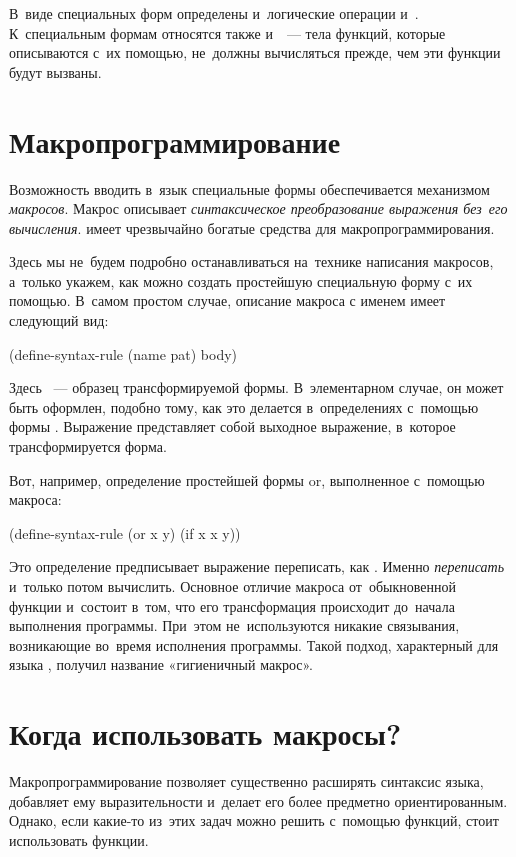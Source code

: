 В~виде специальных форм определены и~логические операции  и~. К~специальным формам относятся также  и~~--- тела функций, которые описываются с~их помощью, не~должны вычисляться прежде, чем эти функции будут вызваны.


\section{Макропрограм\-мирование}\label{macro}%
Возможность вводить в~язык \Scheme специальные формы обеспечивается механизмом \emph{макросов}. Макрос описывает \emph{синтаксическое преобразование выражения без~его вычисления}. \Scheme имеет чрезвычайно богатые средства для макропрограммирования.  

Здесь мы не~будем подробно останавливаться на~технике написания макросов, а~только укажем, как можно создать простейшую специальную форму с~их помощью. В~самом простом случае, описание макроса с именем  имеет следующий вид:

\begin{Specification}[emph={name,pat}]
(define-syntax-rule (name pat)
    body)
\end{Specification}

\noindent Здесь ~--- образец трансформируемой формы. В~элементарном случае, он может быть оформлен, подобно тому, как это делается в~определениях с~помощью формы . Выражение  представляет собой выходное выражение, в~которое трансформируется форма.

Вот, например, определение простейшей формы \si{or}, выполненное с~помощью макроса:

\begin{Definition}[emph={x,y}]
(define-syntax-rule (or x y)
  (if x x y))
\end{Definition}

Это определение предписывает выражение  переписать, как . Именно \emph{переписать} и~только потом вычислить. Основное отличие макроса от~обыкновенной функции и~состоит в~том, что его трансформация происходит до~начала выполнения программы. При~этом не~используются никакие связывания, возникающие во~время исполнения программы. Такой подход, характерный для языка , получил название «гигиеничный макрос».

\section{Когда использовать макросы?}%
Макропрограммирование позволяет существенно расширять синтаксис языка, добавляет ему выразительности и~делает его более предметно ориентированным. Однако, если какие-то из~этих задач можно решить с~помощью функций, стоит использовать функции.

